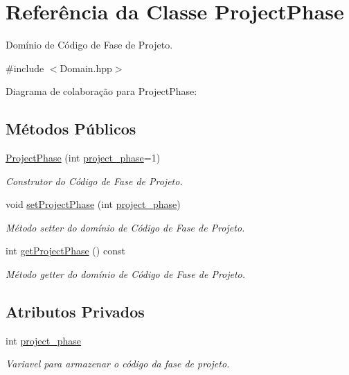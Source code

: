 \hypertarget{classProjectPhase}{}\section{Referência da Classe Project\+Phase}
\label{classProjectPhase}


Domínio de Código de Fase de Projeto.  




{\ttfamily \#include $<$Domain.\+hpp$>$}



Diagrama de colaboração para Project\+Phase\+:
\subsection*{Métodos Públicos}
\begin{DoxyCompactItemize}
\item 
\hyperlink{classProjectPhase_a22ef4b1402f6ddd2c101927bd7793e63}{Project\+Phase} (int \hyperlink{classProjectPhase_a32edffe407c553fd0cabd072dc71bdf9}{project\+\_\+phase}=1)
\begin{DoxyCompactList}\small\item\em Construtor do Código de Fase de Projeto. \end{DoxyCompactList}\item 
void \hyperlink{classProjectPhase_ad3babff97fc60bb738e263fd76ce6245}{set\+Project\+Phase} (int \hyperlink{classProjectPhase_a32edffe407c553fd0cabd072dc71bdf9}{project\+\_\+phase})
\begin{DoxyCompactList}\small\item\em Método setter do domínio de Código de Fase de Projeto. \end{DoxyCompactList}\item 
int \hyperlink{classProjectPhase_ae4848dccd98eb7ec3a6ffc2038b15a0f}{get\+Project\+Phase} () const 
\begin{DoxyCompactList}\small\item\em Método getter do domínio de Código de Fase de Projeto. \end{DoxyCompactList}\end{DoxyCompactItemize}
\subsection*{Atributos Privados}
\begin{DoxyCompactItemize}
\item 
int \hyperlink{classProjectPhase_a32edffe407c553fd0cabd072dc71bdf9}{project\+\_\+phase}\hypertarget{classProjectPhase_a32edffe407c553fd0cabd072dc71bdf9}{}\label{classProjectPhase_a32edffe407c553fd0cabd072dc71bdf9}

\begin{DoxyCompactList}\small\item\em Variavel para armazenar o código da fase de projeto. \end{DoxyCompactList}\end{DoxyCompactItemize}



